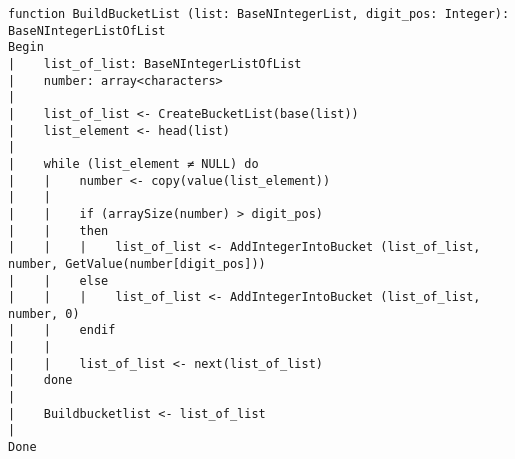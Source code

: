 \begin{lstlisting}[breaklines]
function BuildBucketList (list: BaseNIntegerList, digit_pos: Integer): BaseNIntegerListOfList
Begin
|    list_of_list: BaseNIntegerListOfList
|    number: array<characters>
|
|    list_of_list <- CreateBucketList(base(list))
|    list_element <- head(list)
|
|    while (list_element ≠ NULL) do
|    |    number <- copy(value(list_element))
|    |
|    |    if (arraySize(number) > digit_pos)
|    |    then
|    |    |    list_of_list <- AddIntegerIntoBucket (list_of_list, number, GetValue(number[digit_pos]))
|    |    else
|    |    |    list_of_list <- AddIntegerIntoBucket (list_of_list, number, 0)
|    |    endif
|    |
|    |    list_of_list <- next(list_of_list)
|    done
|
|    Buildbucketlist <- list_of_list
|
Done
\end{lstlisting}
